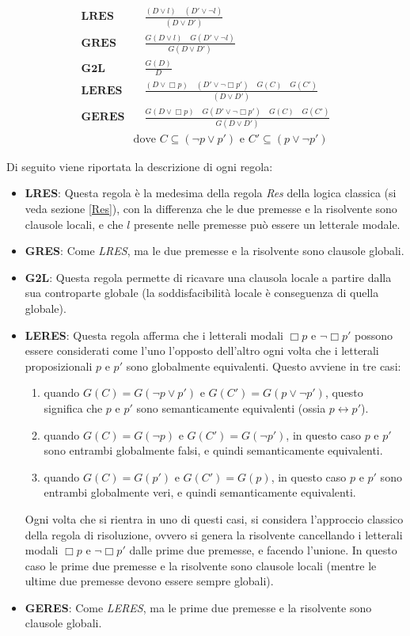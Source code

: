 \documentclass[a4paper,12pt]{report}
\newcommand{\tto} {\leftrightarrow}
\begin{document}
\begin{align*}
    \textbf{LRES} & \quad \frac{(D \lor l) \quad (D' \lor \lnot l)}{(D \lor D')} \\[10pt]
    \textbf{GRES} & \quad \frac{G(D \lor l) \quad G(D' \lor \lnot l)}{G(D \lor D')} \\[10pt]
    \textbf{G2L} & \quad \frac{G(D)}{D} \\[10pt]
    \textbf{LERES} & \quad \frac{(D \lor \Box p) \quad (D' \lor \lnot \Box p') \quad G(C) \quad G(C')}{(D \lor D')} \\[10pt]
    \textbf{GERES} & \quad \frac{G(D \lor \Box p) \quad G(D' \lor \lnot \Box p') \quad G(C) \quad G(C')}{G(D \lor D')} \\[10pt]
    & \text{dove } C \subseteq (\lnot p \lor p') \text{ e } C' \subseteq (p \lor \lnot p')
\end{align*}

Di seguito viene riportata la descrizione di ogni regola:
\begin{itemize}
    \item \textbf{LRES}: Questa regola è la medesima della regola \emph{Res} della logica classica (si veda sezione \ref{Res}), con la differenza che le due premesse e la risolvente sono clausole locali, e che $l$ presente nelle premesse può essere un letterale modale.
    \item \textbf{GRES}: Come \emph{LRES}, ma le due premesse e la risolvente sono clausole globali.
    \item \textbf{G2L}: Questa regola permette di ricavare una clausola locale a partire dalla sua controparte globale (la soddisfacibilità locale è conseguenza di quella globale).
    \item \textbf{LERES}: Questa regola afferma che i letterali modali $\Box p$ e $\lnot \Box p'$ possono essere considerati come l'uno l'opposto dell'altro ogni volta che i letterali proposizionali $p$ e $p'$ sono globalmente equivalenti. Questo avviene in tre casi: \begin{enumerate}
        \item quando $G(C) = G(\lnot p \lor p')$ e $G(C') = G(p \lor \lnot p')$, questo significa che $p$ e $p'$ sono semanticamente equivalenti (ossia $p \tto p'$).
        \item quando $G(C) = G(\lnot p)$ e $G(C') = G(\lnot p')$, in questo caso $p$ e $p'$ sono entrambi globalmente falsi, e quindi semanticamente equivalenti.
        \item quando $G(C) = G(p')$ e $G(C') = G(p)$, in questo caso $p$ e $p'$ sono entrambi globalmente veri, e quindi semanticamente equivalenti.
    \end{enumerate}
    Ogni volta che si rientra in uno di questi casi, si considera l'approccio classico della regola di risoluzione, ovvero si genera la risolvente cancellando i letterali modali $\Box p$ e $\lnot \Box p'$ dalle prime due premesse, e facendo l'unione. In questo caso le prime due premesse e la risolvente sono clausole locali (mentre le ultime due premesse devono essere sempre globali).
    \item \textbf{GERES}: Come \emph{LERES}, ma le prime due premesse e la risolvente sono clausole globali.
\end{itemize}
\end{document}
